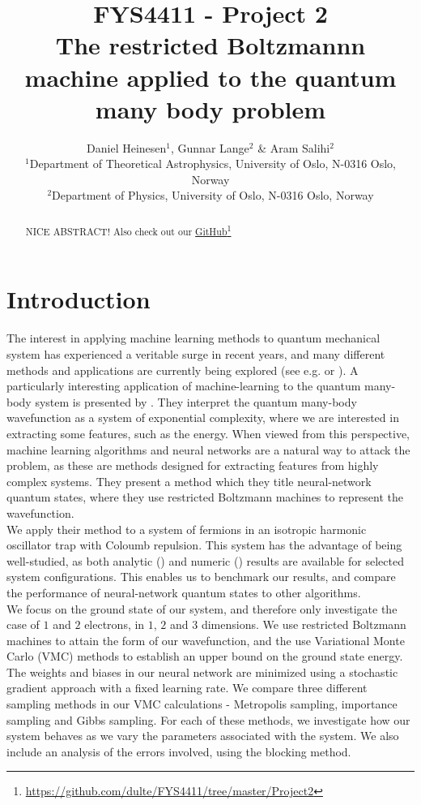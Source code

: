 \documentclass[a4paper, 10pt]{article}
\title{FYS4411 - Project 2\\
	The restricted Boltzmannn machine applied to the quantum many body problem}
\author{Daniel Heinesen$^1$, Gunnar Lange$^2$ \& Aram Salihi$^2$\\
	\small $^1$Department of Theoretical Astrophysics, University of Oslo, N-0316 Oslo, Norway\\
	\small $^2$Department of Physics, University of Oslo, N-0316 Oslo, Norway}
\begin{document}
	\maketitle
	\begin{abstract}
	\begin{center}
	 NICE ABSTRACT! Also check out our \href{https://github.com/dulte/FYS4411/tree/master/Project2}{GitHub}\footnote{\url{https://github.com/dulte/FYS4411/tree/master/Project2}}
\end{center}
	\end{abstract}
	\newpage
	\tableofcontents
	\newpage
	\section{Introduction}
	The interest in applying machine learning methods to quantum mechanical system has experienced a veritable surge in recent years, and many different methods and applications are currently being explored (see e.g. \cite{Broecker2017} or \cite{Botu2015}). A particularly interesting application of machine-learning to the quantum many-body system is presented by \cite{Carleo602}. They interpret the quantum many-body wavefunction as a system of exponential complexity, where we are interested in extracting some features, such as the energy. When viewed from this perspective, machine learning algorithms and neural networks are a natural way to attack the problem, as these are methods designed for extracting features from highly complex systems. They present a method which they title neural-network quantum states, where they use restricted Boltzmann machines to represent the wavefunction.\\
	\linebreak
	We apply their method to a system of fermions in an isotropic harmonic oscillator trap with Coloumb repulsion. This system has the advantage of being well-studied, as both analytic (\cite{0305-4470-27-3-040}) and numeric (\cite{PhysRevB.84.115302}) results are available for selected system configurations. This enables us to benchmark our results, and compare the performance of neural-network quantum states to other algorithms.\\
	\linebreak
	We focus on the ground state of our system, and therefore only investigate the case of $1$ and $2$ electrons, in $1$, $2$ and $3$ dimensions. We use restricted Boltzmann machines to attain the form of our wavefunction, and the use Variational Monte Carlo (VMC) methods to establish an upper bound on the ground state energy. The weights and biases in our neural network are minimized using a stochastic gradient approach with a fixed learning rate. We compare three different sampling methods in our VMC calculations - Metropolis sampling, importance sampling and Gibbs sampling. For each of these methods, we investigate how our system behaves as we vary the parameters associated with the system. We also include an analysis of the errors involved, using the blocking method.
\end{document}
